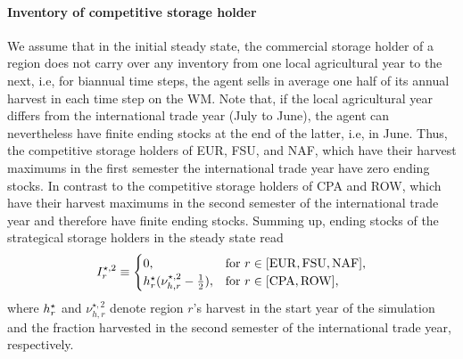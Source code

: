 \paragraph{Inventory of competitive storage holder}
We assume that in the initial steady state, the commercial storage holder of a region does not carry
over any inventory from one local agricultural year to the next, i.e, for biannual time steps, the
agent sells in average one half of its annual harvest in each time step on the WM. Note that, if the
local agricultural year differs from the international trade year (July to June), the agent can
nevertheless have finite ending stocks at the end of the latter, i.e, in June. Thus, the competitive
storage holders of EUR, FSU, and NAF, which have their harvest maximums in the first semester the
international trade year have zero ending stocks. In contrast to the competitive storage holders of
CPA and ROW, which have their harvest maximums in the second semester of the international trade
year and therefore have finite ending stocks. Summing up, ending stocks of the strategical storage
holders in the steady state read
\begin{equation}
  \label{eq:ES_strat_stor}
  I_r^{\star,2}\equiv\begin{cases}
    0, & \text{for }r\in[\operatorname{EUR}, \operatorname{FSU}, \operatorname{NAF}],\\
    h_r^{\star}(\nu_{h,r}^{\star,2}-\frac{1}{2}), & \text{for }r\in[\operatorname{CPA},\operatorname{ROW}],
  \end{cases}
\end{equation}
where $h_r^{\star}$ and $\nu_{h,r}^{\star,2}$ denote region $r$'s harvest in the start year of the
simulation and the fraction harvested in the second semester of the international trade year,
respectively.

